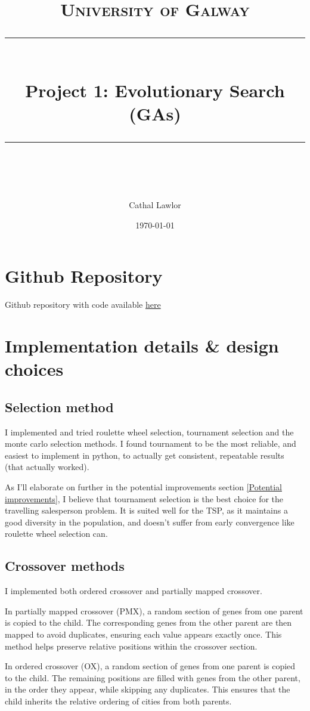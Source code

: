 \documentclass[11pt]{scrartcl} %
\title{	
	\normalfont\normalsize
	\textsc{University of Galway}\\ %
	\vspace{25pt} %
	\rule{\linewidth}{0.5pt}\\ %
	\vspace{20pt} %
	{\huge  Project 1: Evolutionary Search (GAs)}\\ %
	\vspace{12pt} %
	\rule{\linewidth}{2pt}\\ %
	\vspace{12pt} %
}
\author{\LARGE Cathal Lawlor} %
\date{\normalsize\today} %
\begin{document}
\maketitle %

\section{Github Repository}
Github repository with code available \href{https://github.com/Laan33/ai_project_1}{here}

\section{Implementation details \& design choices}

\subsection{Selection method}
I implemented and tried roulette wheel selection, tournament selection and the monte carlo selection methods.
I found tournament to be the most reliable, and easiest to implement in python, to actually get consistent, repeatable results (that actually worked).

As I'll elaborate on further in the potential improvements section \ref{Potential improvements}, I believe that tournament selection is the best choice for the travelling salesperson problem.
It is suited well for the TSP, as it maintains a good diversity in the population, and doesn't suffer from early convergence like roulette wheel selection can\cite{genetic_algorithm_afternoon}.

\subsection{Crossover methods}

I implemented both ordered crossover and partially mapped crossover. 

In partially mapped crossover (PMX)\cite{baeldung_pmx}, a random section of genes from one parent is copied to the child. The corresponding genes from the other parent are then mapped to avoid duplicates, ensuring each value appears exactly once. This method helps preserve relative positions within the crossover section.

In ordered crossover (OX)\cite{ordered_crossover_stackoverflow}, a random section of genes from one parent is copied to the child. The remaining positions are filled with genes from the other parent, in the order they appear, while skipping any duplicates. This ensures that the child inherits the relative ordering of cities from both parents.
\end{document}
